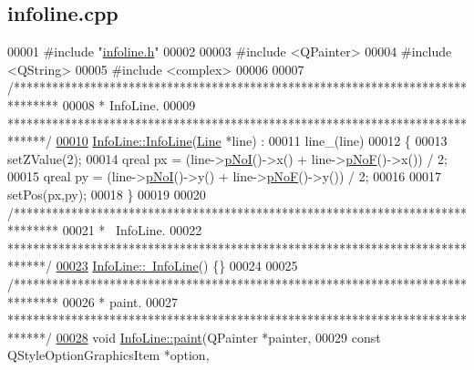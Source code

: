 \hypertarget{infoline_8cpp_source}{}\subsection{infoline.\+cpp}
\label{infoline_8cpp_source}

\begin{DoxyCode}
00001 \textcolor{preprocessor}{#include "\hyperlink{infoline_8h}{infoline.h}"}
00002 
00003 \textcolor{preprocessor}{#include <QPainter>}
00004 \textcolor{preprocessor}{#include <QString>}
00005 \textcolor{preprocessor}{#include <complex>}
00006 
00007 \textcolor{comment}{/*******************************************************************************}
00008 \textcolor{comment}{ * InfoLine.}
00009 \textcolor{comment}{ ******************************************************************************/}
\hypertarget{infoline_8cpp_source_l00010}{}\hyperlink{class_info_line_a63819dbfeb257cc86be86f0fac3aa02f}{00010} \hyperlink{class_info_line_a63819dbfeb257cc86be86f0fac3aa02f}{InfoLine::InfoLine}(\hyperlink{class_line}{Line} *line) :
00011   line\_(line)
00012 \{
00013   setZValue(2);
00014   qreal px = (line->\hyperlink{group___models_gaeafd90e84ac2f8de2a879abe9e53eef3}{pNoI}()->x() + line->\hyperlink{group___models_gabbc73ddedd3075c33ae5331bd7c9829f}{pNoF}()->x()) / 2;
00015   qreal py = (line->\hyperlink{group___models_gaeafd90e84ac2f8de2a879abe9e53eef3}{pNoI}()->y() + line->\hyperlink{group___models_gabbc73ddedd3075c33ae5331bd7c9829f}{pNoF}()->y()) / 2;
00016 
00017   setPos(px,py);
00018 \}
00019 
00020 \textcolor{comment}{/*******************************************************************************}
00021 \textcolor{comment}{ * ~InfoLine.}
00022 \textcolor{comment}{ ******************************************************************************/}
\hypertarget{infoline_8cpp_source_l00023}{}\hyperlink{class_info_line_ac3497eeb5f2719fb4fac42434955597d}{00023} \hyperlink{class_info_line_ac3497eeb5f2719fb4fac42434955597d}{InfoLine::~InfoLine}() \{\}
00024 
00025 \textcolor{comment}{/*******************************************************************************}
00026 \textcolor{comment}{ * paint.}
00027 \textcolor{comment}{ ******************************************************************************/}
\hypertarget{infoline_8cpp_source_l00028}{}\hyperlink{class_info_line_ac696c9944716774dfe85a40ac5a434e1}{00028} \textcolor{keywordtype}{void} \hyperlink{class_info_line_ac696c9944716774dfe85a40ac5a434e1}{InfoLine::paint}(QPainter *painter,
00029                      \textcolor{keyword}{const} QStyleOptionGraphicsItem *option,

\end{DoxyCode}
